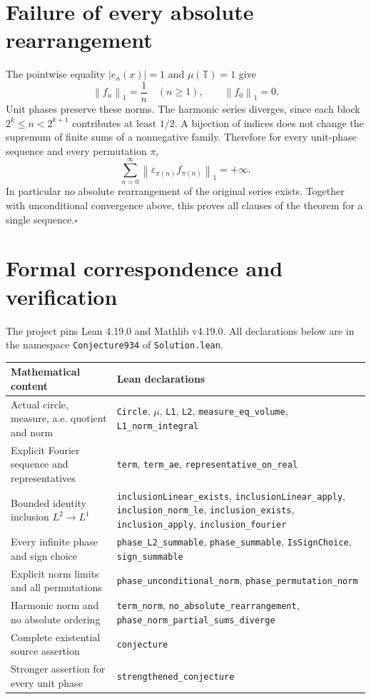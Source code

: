 \documentclass[11pt]{article}
\newcommand{\T}{\mathbb{T}}
\newcommand{\norm}[1]{\left\lVert#1\right\rVert}
\begin{document}
\section{Failure of every absolute rearrangement}
The pointwise equality $|e_n(x)|=1$ and $\mu(\T)=1$ give
\[
 \norm{f_n}_1=\frac1n\quad(n\geq1),\qquad\norm{f_0}_1=0.
\]
Unit phases preserve these norms. The harmonic series diverges, since each
block $2^k\leq n<2^{k+1}$ contributes at least $1/2$.
A bijection of indices does not change the supremum of finite sums of a
nonnegative family. Therefore for every unit-phase sequence and every
permutation $\pi$,
\[
 \sum_{n=0}^{\infty}\norm{\varepsilon_{\pi(n)}f_{\pi(n)}}_1=+\infty.
\]
In particular no absolute rearrangement of the original series exists.
Together with unconditional convergence above, this proves all clauses of
the theorem for a single sequence.\hfill$\square$

\section{Formal correspondence and verification}
The project pins Lean 4.19.0 and Mathlib v4.19.0. All declarations below are
in the namespace \texttt{Conjecture934} of \texttt{Solution.lean}.

\begin{center}
\begin{tabular}{>{\raggedright\arraybackslash}p{}>{\raggedright\arraybackslash}p{}}
\hline
Mathematical content & Lean declarations\\\hline
Actual circle, measure, a.e. quotient and norm &
\texttt{Circle}, $\mu$, \texttt{L1}, \texttt{L2},
\texttt{measure\_eq\_volume}, \texttt{L1\_norm\_integral}\\[4pt]
Explicit Fourier sequence and representatives &
\texttt{term}, \texttt{term\_ae}, \texttt{representative\_on\_real}\\[4pt]
Bounded identity inclusion $L^2\to L^1$ &
\texttt{inclusionLinear\_exists}, \texttt{inclusionLinear\_apply},
\texttt{inclusion\_norm\_le}, \texttt{inclusion\_exists},
\texttt{inclusion\_apply}, \texttt{inclusion\_fourier}\\[4pt]
Every infinite phase and sign choice &
\texttt{phase\_L2\_summable}, \texttt{phase\_summable},
\texttt{IsSignChoice}, \texttt{sign\_summable}\\[4pt]
Explicit norm limits and all permutations &
\texttt{phase\_unconditional\_norm},
\texttt{phase\_permutation\_norm}\\[4pt]
Harmonic norm and no absolute ordering &
\texttt{term\_norm}, \texttt{no\_absolute\_rearrangement},
\texttt{phase\_norm\_partial\_sums\_diverge}\\[4pt]
Complete existential source assertion & \texttt{conjecture}\\[4pt]
Stronger assertion for every unit phase & \texttt{strengthened\_conjecture}\\\hline
\end{tabular}
\end{center}
\end{document}
